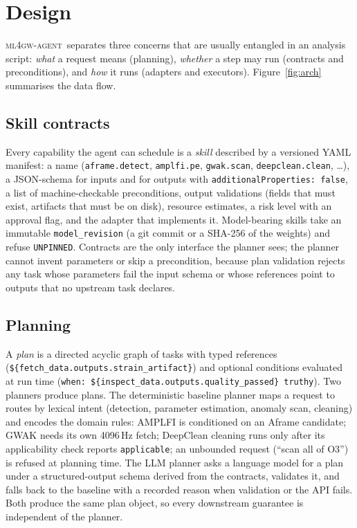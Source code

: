 \documentclass[twocolumn]{aastex631}
\newcommand{\agent}{\textsc{ml4gw-agent}}
\begin{document}
\section{Design}
\label{sec:design}

\agent\ separates three concerns that are usually entangled in an analysis
script: \emph{what} a request means (planning), \emph{whether} a step may
run (contracts and preconditions), and \emph{how} it runs (adapters and
executors). Figure~\ref{fig:arch} summarises the data flow.

\subsection{Skill contracts}
\label{sec:contracts}
Every capability the agent can schedule is a \emph{skill} described by a
versioned YAML manifest: a name (\texttt{aframe.detect},
\texttt{amplfi.pe}, \texttt{gwak.scan}, \texttt{deepclean.clean}, \ldots), a
JSON-schema for inputs and for outputs with \texttt{additionalProperties:
false}, a list of machine-checkable preconditions, output validations
(fields that must exist, artifacts that must be on disk), resource
estimates, a risk level with an approval flag, and the adapter that
implements it. Model-bearing skills take an immutable \texttt{model\_revision}
(a git commit or a SHA-256 of the weights) and refuse \texttt{UNPINNED}.
Contracts are the only interface the planner sees; the planner cannot
invent parameters or skip a precondition, because plan validation rejects
any task whose parameters fail the input schema or whose references point to
outputs that no upstream task declares.

\subsection{Planning}
\label{sec:planner}
A \emph{plan} is a directed acyclic graph of tasks with typed references
(\texttt{\$\{fetch\_data.outputs.strain\_artifact\}}) and optional conditions
evaluated at run time (\texttt{when: \$\{inspect\_data.outputs.quality\_passed\}
truthy}). Two planners produce plans. The deterministic baseline planner
maps a request to routes by lexical intent (detection, parameter
estimation, anomaly scan, cleaning) and encodes the domain rules: AMPLFI is
conditioned on an Aframe candidate; GWAK needs its own 4096\,Hz fetch;
DeepClean cleaning runs only after its applicability check reports
\texttt{applicable}; an unbounded request (``scan all of O3'') is refused at
planning time. The LLM planner asks a language model for a plan under a
structured-output schema derived from the contracts, validates it, and
falls back to the baseline with a recorded reason when validation or the
API fails. Both produce the same plan object, so every downstream guarantee
is independent of the planner.
\end{document}
